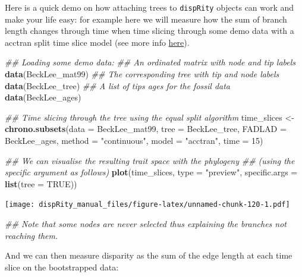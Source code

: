 \documentclass[]{book}
\newenvironment{Shaded}{\begin{snugshade}}{\end{snugshade}}
\newcommand{\CommentTok}[1]{\textcolor[rgb]{0.56,0.35,0.01}{\textit{#1}}}
\newcommand{\DataTypeTok}[1]{\textcolor[rgb]{0.13,0.29,0.53}{#1}}
\newcommand{\DecValTok}[1]{\textcolor[rgb]{0.00,0.00,0.81}{#1}}
\newcommand{\KeywordTok}[1]{\textcolor[rgb]{0.13,0.29,0.53}{\textbf{#1}}}
\newcommand{\NormalTok}[1]{#1}
\newcommand{\OtherTok}[1]{\textcolor[rgb]{0.56,0.35,0.01}{#1}}
\newcommand{\StringTok}[1]{\textcolor[rgb]{0.31,0.60,0.02}{#1}}
\begin{document}
Here is a quick demo on how attaching trees to \texttt{dispRity} objects can work and make your life easy: for example here we will measure how the sum of branch length changes through time when time slicing through some demo data with a acctran split time slice model (see more info \protect\hyperlink{chrono-subsets}{here}).

\begin{Shaded}
\begin{Highlighting}[]
\CommentTok{## Loading some demo data:}
\CommentTok{## An ordinated matrix with node and tip labels}
\KeywordTok{data}\NormalTok{(BeckLee_mat99)}
\CommentTok{## The corresponding tree with tip and node labels}
\KeywordTok{data}\NormalTok{(BeckLee_tree)}
\CommentTok{## A list of tips ages for the fossil data}
\KeywordTok{data}\NormalTok{(BeckLee_ages)}

\CommentTok{## Time slicing through the tree using the equal split algorithm}
\NormalTok{time_slices <-}\StringTok{ }\KeywordTok{chrono.subsets}\NormalTok{(}\DataTypeTok{data   =}\NormalTok{ BeckLee_mat99,}
                              \DataTypeTok{tree   =}\NormalTok{ BeckLee_tree,}
                              \DataTypeTok{FADLAD =}\NormalTok{ BeckLee_ages,}
                              \DataTypeTok{method =} \StringTok{"continuous"}\NormalTok{,}
                              \DataTypeTok{model  =} \StringTok{"acctran"}\NormalTok{,}
                              \DataTypeTok{time   =} \DecValTok{15}\NormalTok{)}

\CommentTok{## We can visualise the resulting trait space with the phylogeny}
\CommentTok{## (using the specific argument as follows)}
\KeywordTok{plot}\NormalTok{(time_slices, }\DataTypeTok{type =} \StringTok{"preview"}\NormalTok{,}
     \DataTypeTok{specific.args =} \KeywordTok{list}\NormalTok{(}\DataTypeTok{tree =} \OtherTok{TRUE}\NormalTok{))}
\end{Highlighting}
\end{Shaded}

\texttt{[image: dispRity\_manual\_files/figure-latex/unnamed-chunk-120-1.pdf]}

\begin{Shaded}
\begin{Highlighting}[]
\CommentTok{## Note that some nodes are never selected thus explaining the branches not reaching them.}
\end{Highlighting}
\end{Shaded}

And we can then measure disparity as the sum of the edge length at each time slice on the bootstrapped data:
\end{document}

